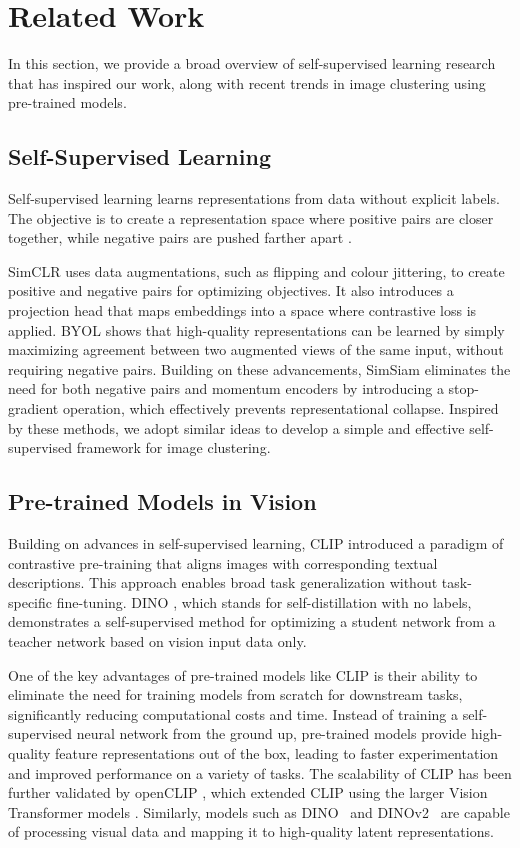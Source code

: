 \section{Related Work}
In this section, we provide a broad overview of self-supervised learning research that has inspired our work, along with recent trends in image clustering using pre-trained models.


\subsection{Self-Supervised Learning}
Self-supervised learning learns representations from data without explicit labels. The objective is to create a representation space where positive pairs are closer together, while negative pairs are pushed farther apart \cite{geiping2023cookbook}.

SimCLR \cite{chen2020simple} uses data augmentations, such as flipping and colour jittering, to create positive and negative pairs for optimizing objectives. It also introduces a projection head that maps embeddings into a space where contrastive loss is applied. BYOL \cite{grill2020bootstrap} shows that high-quality representations can be learned by simply maximizing agreement between two augmented views of the same input, without requiring negative pairs. Building on these advancements, SimSiam \cite{chen2020exploringsimplesiameserepresentation} eliminates the need for both negative pairs and momentum encoders by introducing a stop-gradient operation, which effectively prevents representational collapse. Inspired by these methods, we adopt similar ideas to develop a simple and effective self-supervised framework for image clustering.

\subsection{Pre-trained Models in Vision} 
Building on advances in self-supervised learning, CLIP \cite{radford2021learning} introduced a paradigm of contrastive pre-training that aligns images with corresponding textual descriptions. This approach enables broad task generalization without task-specific fine-tuning. DINO \cite{caron2021emerging}, which stands for self-distillation with no labels, demonstrates a self-supervised method for optimizing a student network from a teacher network based on vision input data only.

One of the key advantages of pre-trained models like CLIP is their ability to eliminate the need for training models from scratch for downstream tasks, significantly reducing computational costs and time. Instead of training a self-supervised neural network from the ground up, pre-trained models provide high-quality feature representations out of the box, leading to faster experimentation and improved performance on a variety of tasks. The scalability of CLIP has been further validated by openCLIP \cite{Cherti_2023}, which extended CLIP using the larger Vision Transformer models \cite{dosovitskiy2020image}. Similarly, models such as DINO~\cite{9709990} and DINOv2~\cite{oquab2024dinov2learningrobustvisual} are capable of processing visual data and mapping it to high-quality latent representations.

